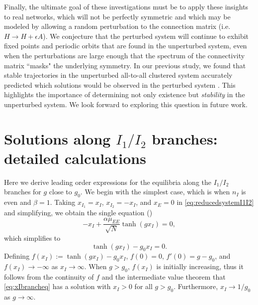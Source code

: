 \documentclass[reqno]{siamonline190516}
\begin{document}
Finally, the ultimate goal of these investigations must be to apply these insights to real networks, which will not be perfectly symmetric and which may be modeled by allowing a random perturbation to the connection matrix (i.e. $H \rightarrow H + \epsilon A$). We conjecture that the perturbed system will continue to exhibit fixed points and periodic orbits that are found in the unperturbed system, even when the perturbations are large enough that the spectrum of the connectivity matrix ``masks" the underlying symmetry. In our previous study, we found that stable trajectories in the unperturbed all-to-all clustered system accurately predicted which solutions would be observed in the perturbed system \cite{Barreiro2017}. This highlights the importance of determining not only existence but \emph{stability} in the unperturbed system. We look forward to exploring this question in future work.


\appendix

\section{Solutions along \texorpdfstring{$I_1/I_2$}{I1/I2} branches: detailed calculations}\label{app:I1I2sol}

Here we derive leading order expressions for the equilibria along the $I_1/I_2$ branches for $g$ close to $g_0$. We begin with the simplest case, which is when $n_I$ is even and $\beta = 1$. 
Taking $x_{I_1} = x_I$, $x_{I_2} = -x_I$, and $x_E = 0$ in \cref{eq:reducedsystemI1I2} and simplifying, we obtain the single equation (\cite[{Eq. 16}]{Barreiro2017})
\[
-x_I + \frac{\alpha \mu_{EE} }{\sqrt{N}} \tanh(g x_I) = 0, 
\]
which simplifies to 
\begin{equation}\label{eq:xIbrancheq}
\tanh(g x_I) - g_0 x_I = 0.
\end{equation}
Defining $f(x_I) := \tanh(g x_I) - g_0 x_I$, $f(0) = 0$, $f'(0) = g - g_0$, and $f(x_I) \rightarrow -\infty$ as $x_I \rightarrow \infty$. When $g > g_0$, $f(x_I)$ is initially increasing, thus it follows from the continuity of $f$ and the intermediate value theorem that \cref{eq:xIbrancheq} has a solution with $x_I > 0$ for all $g > g_0$. Furthermore, $x_I \rightarrow 1/g_0$ as $g \rightarrow \infty$.
\end{document}
